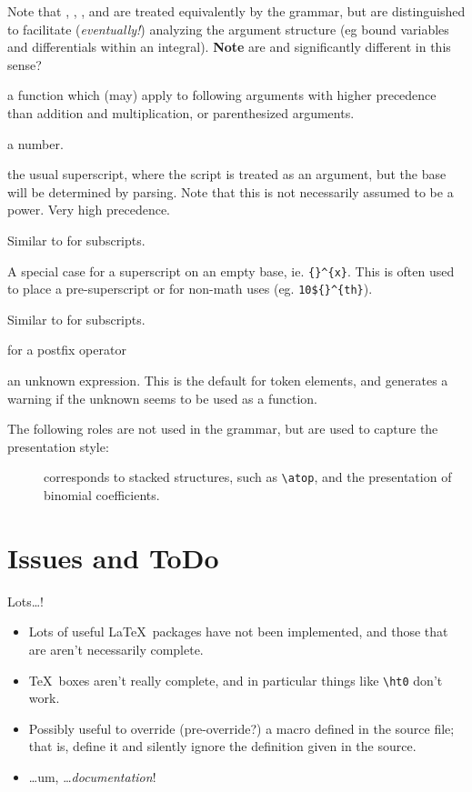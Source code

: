 \documentclass{report}
\begin{document}
\begin{description}
 Note that , , ,  and  are treated
 equivalently by the grammar, but are distinguished to facilitate (\emph{eventually!}) 
 analyzing the argument structure (eg bound variables and differentials within an integral).
 \textbf{Note} are  and  significantly different in this sense?
\item[\code{VERTBAR}]
\item[\code{FUNCTION}] a function which (may) apply to following arguments with higher
   precedence than addition and multiplication, or parenthesized arguments.
\item[\code{NUMBER}] a number.
\item[\code{POSTSUPERSCRIPT}] the usual superscript, where the script is treated as
  an argument, but the base will be determined by parsing. Note that this is not
  necessarily assumed to be a power. Very high precedence.
\item[\code{POSTSUBSCRIPT}] Similar to  for subscripts.
\item[\code{FLOATINGSUPERSCRIPT}] A special case for a superscript on an empty base,
  ie. \verb|{}^{x}|.  This is often used to place a pre-superscript or for
  non-math uses (eg. \verb|10${}^{th}|).
\item[\code{FLOATINGSUBSCRIPT}] Similar to  for subscripts.
\item[\code{POSTFIX}] for a postfix operator
\item[\code{UNKNOWN}] an unknown expression. This is the default for token elements,
  and generates a warning if the unknown seems to be used as a function.
\end{description}

The following roles are not used in the grammar, but are used to capture
the presentation style:
\begin{description}
\item[] corresponds to stacked structures, such as
  \verb|\atop|, and the presentation of binomial coefficients.
\end{description}

\chapter{Issues and ToDo}\label{todo}
Lots\ldots!
\begin{itemize}
\item Lots of useful \LaTeX\ packages have not been implemented, and those
  that are aren't necessarily complete.
\item \TeX\ boxes aren't really complete, and in particular things like \verb|\ht0|
  don't work.
\item Possibly useful to override (pre-override?) a macro defined in the source file;
  that is, define it and silently ignore the definition given in the source.
\item \ldots um, \ldots \emph{documentation}!
\end{itemize}
\end{document}
